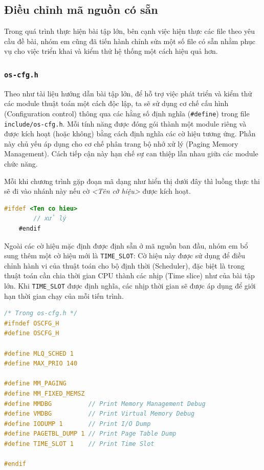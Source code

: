 \subsection{Điều chỉnh mã nguồn có sẵn}

Trong quá trình thực hiện bài tập lớn, bên cạnh việc hiện thực các file theo yêu cầu đề bài, nhóm em cũng đã tiến hành chỉnh sửa một số file có sẵn nhằm phục vụ cho việc triển khai và kiểm thử hệ thống một cách hiệu quả hơn.

\subsubsection{\texttt{os-cfg.h}}

Theo như tài liệu hướng dẫn bài tập lớn, để hỗ trợ việc phát triển và kiểm thử các module thuật toán một cách độc lập, ta sẽ sử dụng cơ chế cấu hình (Configuration control) thông qua các hằng số định nghĩa (\texttt{\#define}) trong file \texttt{include/os-cfg.h}. Mỗi tính năng được đóng gói thành một module riêng và được kích hoạt (hoặc không) bằng cách định nghĩa các cờ hiệu tương ứng. Phần này chủ yếu áp dụng cho cơ chế phân trang bộ nhớ xử lý (Paging Memory Management). Cách tiếp cận này hạn chế sự can thiệp lẫn nhau giữa các module chức năng.

Mỗi khi chương trình gặp đoạn mã dạng như hiển thị dưới đây thì luồng thực thi sẽ đi vào nhánh này nếu cờ \textit{<Tên cờ hiệu>} được kích hoạt.

\begin{lstlisting}[style=Cstyle,language=C]
    #ifdef <Ten co hieu>
        // xử lý
    #endif
\end{lstlisting}


Ngoài các cờ hiệu mặc định được định sẵn ở mã nguồn ban đầu, nhóm em bổ sung thêm một cờ hiệu mới là \texttt{TIME\_SLOT}: Cờ hiệu này được sử dụng để điều chỉnh hành vi của thuật toán cho bộ định thời (Scheduler), đặc biệt là trong thuật toán cần chia thời gian CPU thành các nhịp (Time slice) như của bài tập lớn. Khi \texttt{TIME\_SLOT} được định nghĩa, các nhịp thời gian sẽ được áp dụng để giới hạn thời gian chạy của mỗi tiến trình.

\begin{lstlisting}[style=Cstyle,language=C]
 /* Trong os-cfg.h */
#ifndef OSCFG_H
#define OSCFG_H

#define MLQ_SCHED 1
#define MAX_PRIO 140

#define MM_PAGING
#define MM_FIXED_MEMSZ
#define MMDBG          // Print Memory Management Debug
#define VMDBG          // Print Virtual Memory Debug
#define IODUMP 1       // Print I/O Dump
#define PAGETBL_DUMP 1 // Print Page Table Dump
#define TIME_SLOT 1    // Print Time Slot

#endif
\end{lstlisting}

